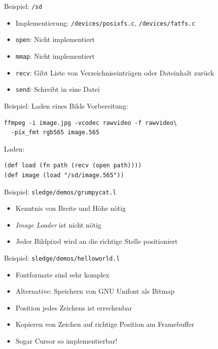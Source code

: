 \documentclass[presentation]{beamer}
\begin{document}
\begin{frame}[fragile,label=sec-4-6]{Beispiel: \texttt{/sd}}
 \begin{itemize}
\item Implementierung: \texttt{/devices/posixfs.c}, \texttt{/devices/fatfs.c}
\item \texttt{open}: Nicht implementiert
\item \texttt{mmap}: Nicht implementiert
\item \texttt{recv}: Gibt Liste von Verzeichniseinträgen oder Dateinhalt zurück
\item \texttt{send}: Schreibt in eine Datei
\end{itemize}
\end{frame}

\begin{frame}[fragile,label=sec-4-7]{Beispiel: Laden eines Bilds}
 Vorbereitung:

\begin{verbatim}
ffmpeg -i image.jpg -vcodec rawvideo -f rawvideo\
  -pix_fmt rgb565 image.565
\end{verbatim}

Laden:

\begin{verbatim}
(def load (fn path (recv (open path))))
(def image (load "/sd/image.565"))
\end{verbatim}
\end{frame}

\begin{frame}[fragile,label=sec-4-8]{Beispiel: \texttt{sledge/demos/grumpycat.l}}
 \begin{itemize}
\item Kenntnis von Breite und Höhe nötig
\item \emph{Image Loader} ist nicht nötig
\item Jeder Bildpixel wird an die richtige Stelle positioniert
\end{itemize}
\end{frame}

\begin{frame}[fragile,label=sec-4-9]{Beispiel: \texttt{sledge/demos/helloworld.l}}
 \begin{itemize}
\item Fontformate sind sehr komplex
\item Alternative: Speichern von GNU Unifont als Bitmap
\item Position jedes Zeichens ist errechenbar
\item Kopieren von Zeichen auf richtige Position am Framebuffer
\item Sogar Cursor so implementierbar!
\end{itemize}
\end{frame}
\end{document}
